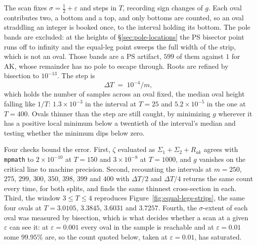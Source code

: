 \documentclass[11pt]{article}
\theoremstyle{definition}
\begin{document}
The scan fixes $\sigma=\tfrac12+\varepsilon$ and steps in $T$, recording sign
changes of $g$. Each oval contributes two, a bottom and a top, and only bottoms
are counted, so an oval straddling an integer is booked once, to the interval
holding its bottom. The pole bands are excluded: at the heights of
\S\ref{sec:pole-locations} the PS bisector point runs off to infinity and the
equal-leg point sweeps the full width of the strip, which is not an oval. Those
bands are a PS artifact, $599$ of them against $1$ for AK, whose remainder has
no pole to escape through. Roots are refined by bisection to $10^{-13}$. The
step is
\begin{equation}\label{eq:oval-step}
\Delta T\;=\;10^{-4}/m ,
\end{equation}
which holds the number of samples across an oval fixed, the median oval height
falling like $1/T$: $1.3\times10^{-3}$ in the interval at $T=25$ and
$5.2\times10^{-5}$ in the one at $T=400$. Ovals thinner than the step are still caught, by minimizing $g$
wherever it has a positive local minimum below a twentieth of the interval's
median and testing whether the minimum dips below zero.

Four checks bound the error. First, $\zeta$ evaluated as $\Sigma_1+\Sigma_2+R_{ak}$
agrees with \texttt{mpmath} to $2\times10^{-10}$ at $T=150$ and
$3\times10^{-8}$ at $T=1000$, and $g$ vanishes on the critical line to machine
precision. Second, recounting the intervals at $m=250$, $275$, $299$, $300$, $350$, $398$,
$399$ and $400$ with $\Delta T/2$ and $\Delta T/4$ returns the same count every
time, for both splits, and finds the same thinnest cross-section in each. Third, the window $3\le T\le4$ reproduces
Figure~\ref{fig:equal-legs-strips}, the same four ovals at $T=3.0105$,
$3.3845$, $3.6031$ and $3.7257$. Fourth, the $\sigma$-extent of each oval was
measured by bisection, which is what decides whether a scan at a given
$\varepsilon$ can see it: at $\varepsilon=0.001$ every oval in the sample is
reachable and at $\varepsilon=0.01$ some $99.95\%$ are, so the count quoted
below, taken at $\varepsilon=0.01$, has saturated.
\end{document}
